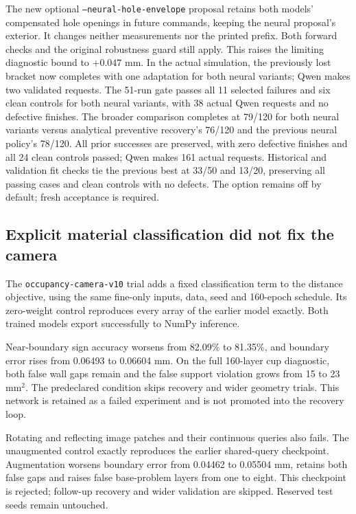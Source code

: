 \documentclass[10pt,letterpaper]{article}
\begin{document}
The new optional \texttt{--neural-hole-envelope} proposal retains both models'
compensated hole openings in future commands, keeping the neural proposal's
exterior. It changes neither measurements nor the printed prefix. Both forward
checks and the original robustness guard still apply. This raises the limiting
diagnostic bound to $+0.047$ mm. In the actual simulation, the previously lost
bracket now completes with one adaptation for both neural variants; Qwen makes
two validated requests. The 51-run gate passes all 11 selected failures and six
clean controls for both neural variants, with 38 actual Qwen requests and no
defective finishes. The broader comparison completes at 79/120 for both neural
variants versus analytical preventive recovery's 76/120 and the previous neural
policy's 78/120. All prior successes are preserved, with zero defective finishes
and all 24 clean controls passed; Qwen makes 161 actual requests. Historical and
validation fit checks tie the previous best at 33/50 and 13/20, preserving all
passing cases and clean controls with no defects. The option remains off by
default; fresh acceptance is required.

\subsection*{Explicit material classification did not fix the camera}
The \texttt{occupancy-camera-v10} trial adds a fixed classification term to the
distance objective, using the same fine-only inputs, data, seed and 160-epoch
schedule. Its zero-weight control reproduces every array of the earlier model
exactly. Both trained models export successfully to NumPy inference.

Near-boundary sign accuracy worsens from 82.09\% to 81.35\%, and boundary error
rises from 0.06493 to 0.06604 mm. On the full 160-layer cup diagnostic, both false
wall gaps remain and the false support violation grows from 15 to 23 mm$^2$.
The predeclared condition skips recovery and wider geometry trials. This network
is retained as a failed experiment and is not promoted into the recovery loop.

Rotating and reflecting image patches and their continuous queries also fails.
The unaugmented control exactly reproduces the earlier shared-query checkpoint.
Augmentation worsens boundary error from 0.04462 to 0.05504 mm, retains both false
gaps and raises false base-problem layers from one to eight. This checkpoint is
rejected; follow-up recovery and wider validation are skipped. Reserved test
seeds remain untouched.
\end{document}
